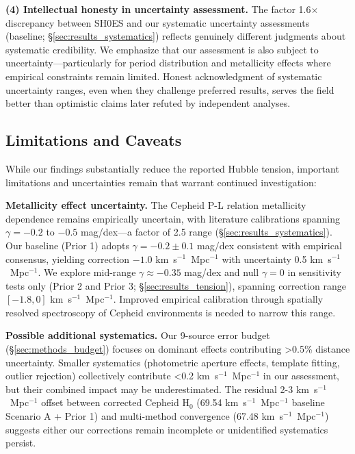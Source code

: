 \documentclass[preprint, linenumbers]{aastex701}
\begin{document}
\textbf{(4) Intellectual honesty in uncertainty assessment.} The factor 1.6$\times$ discrepancy between SH0ES and our systematic uncertainty assessments (baseline; \S\ref{sec:results_systematics}) reflects genuinely different judgments about systematic credibility. We emphasize that our assessment is also subject to uncertainty---particularly for period distribution and metallicity effects where empirical constraints remain limited. Honest acknowledgment of systematic uncertainty ranges, even when they challenge preferred results, serves the field better than optimistic claims later refuted by independent analyses.

\subsection{Limitations and Caveats}

While our findings substantially reduce the reported Hubble tension, important limitations and uncertainties remain that warrant continued investigation:

\textbf{Metallicity effect uncertainty.} The Cepheid P-L relation metallicity dependence remains empirically uncertain, with literature calibrations spanning $\gamma = -0.2$ to $-0.5$ mag/dex---a factor of 2.5 range (\S\ref{sec:results_systematics}). Our baseline (Prior 1) adopts $\gamma = -0.2 \pm 0.1$ mag/dex consistent with empirical consensus, yielding correction $-1.0$ km~s$^{-1}$~Mpc$^{-1}$ with uncertainty 0.5 km~s$^{-1}$~Mpc$^{-1}$. We explore mid-range $\gamma \approx -0.35$ mag/dex and null $\gamma = 0$ in sensitivity tests only (Prior 2 and Prior 3; \S\ref{sec:results_tension}), spanning correction range $[-1.8, 0]$ km~s$^{-1}$~Mpc$^{-1}$. Improved empirical calibration through spatially resolved spectroscopy of Cepheid environments is needed to narrow this range.

\textbf{Possible additional systematics.} Our 9-source error budget (\S\ref{sec:methods_budget}) focuses on dominant effects contributing >0.5\% distance uncertainty. Smaller systematics (photometric aperture effects, template fitting, outlier rejection) collectively contribute <0.2 km~s$^{-1}$~Mpc$^{-1}$ in our assessment, but their combined impact may be underestimated. The residual 2-3 km~s$^{-1}$~Mpc$^{-1}$ offset between corrected Cepheid H$_0$ (69.54 km~s$^{-1}$~Mpc$^{-1}$ baseline Scenario A + Prior 1) and multi-method convergence (67.48 km~s$^{-1}$~Mpc$^{-1}$) suggests either our corrections remain incomplete or unidentified systematics persist.
\end{document}
